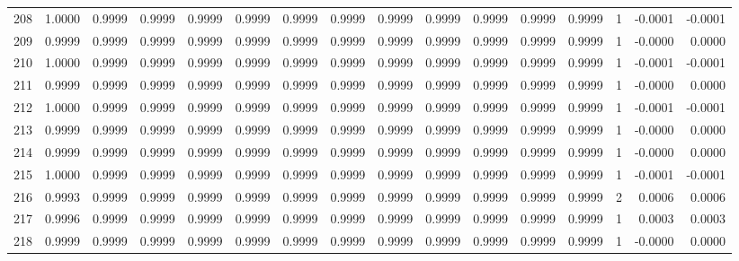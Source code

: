 \begin{tabular}{lrrrrrrrrrrrrrrr}
208 &      1.0000 &  0.9999 &  0.9999 &  0.9999 &  0.9999 &  0.9999 &  0.9999 &  0.9999 &  0.9999 &  0.9999 &   0.9999 &     0.9999 &      1 &                   -0.0001 &                    -0.0001 \\
209 &      0.9999 &  0.9999 &  0.9999 &  0.9999 &  0.9999 &  0.9999 &  0.9999 &  0.9999 &  0.9999 &  0.9999 &   0.9999 &     0.9999 &      1 &                   -0.0000 &                     0.0000 \\
210 &      1.0000 &  0.9999 &  0.9999 &  0.9999 &  0.9999 &  0.9999 &  0.9999 &  0.9999 &  0.9999 &  0.9999 &   0.9999 &     0.9999 &      1 &                   -0.0001 &                    -0.0001 \\
211 &      0.9999 &  0.9999 &  0.9999 &  0.9999 &  0.9999 &  0.9999 &  0.9999 &  0.9999 &  0.9999 &  0.9999 &   0.9999 &     0.9999 &      1 &                   -0.0000 &                     0.0000 \\
212 &      1.0000 &  0.9999 &  0.9999 &  0.9999 &  0.9999 &  0.9999 &  0.9999 &  0.9999 &  0.9999 &  0.9999 &   0.9999 &     0.9999 &      1 &                   -0.0001 &                    -0.0001 \\
213 &      0.9999 &  0.9999 &  0.9999 &  0.9999 &  0.9999 &  0.9999 &  0.9999 &  0.9999 &  0.9999 &  0.9999 &   0.9999 &     0.9999 &      1 &                   -0.0000 &                     0.0000 \\
214 &      0.9999 &  0.9999 &  0.9999 &  0.9999 &  0.9999 &  0.9999 &  0.9999 &  0.9999 &  0.9999 &  0.9999 &   0.9999 &     0.9999 &      1 &                   -0.0000 &                     0.0000 \\
215 &      1.0000 &  0.9999 &  0.9999 &  0.9999 &  0.9999 &  0.9999 &  0.9999 &  0.9999 &  0.9999 &  0.9999 &   0.9999 &     0.9999 &      1 &                   -0.0001 &                    -0.0001 \\
216 &      0.9993 &  0.9999 &  0.9999 &  0.9999 &  0.9999 &  0.9999 &  0.9999 &  0.9999 &  0.9999 &  0.9999 &   0.9999 &     0.9999 &      2 &                    0.0006 &                     0.0006 \\
217 &      0.9996 &  0.9999 &  0.9999 &  0.9999 &  0.9999 &  0.9999 &  0.9999 &  0.9999 &  0.9999 &  0.9999 &   0.9999 &     0.9999 &      1 &                    0.0003 &                     0.0003 \\
218 &      0.9999 &  0.9999 &  0.9999 &  0.9999 &  0.9999 &  0.9999 &  0.9999 &  0.9999 &  0.9999 &  0.9999 &   0.9999 &     0.9999 &      1 &                   -0.0000 &                     0.0000 \\

\end{tabular}
